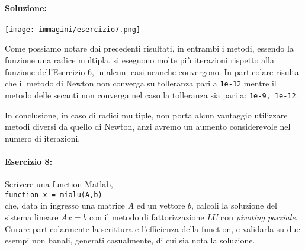 \documentclass[12pt]{article}
\begin{document}
\paragraph{Soluzione:}
\begin{center}
    \texttt{[image: immagini/esercizio7.png]}
\end{center}
Come possiamo notare dai precedenti risultati, in entrambi i metodi, essendo la funzione una radice multipla, si eseguono molte più iterazioni rispetto alla funzione 
dell'Esercizio 6, in alcuni casi neanche convergono.
In particolare risulta che il metodo di Newton non converga su tolleranza pari a \texttt{1e-12} mentre il metodo delle secanti non converga nel caso la tolleranza sia pari a:
\texttt{1e-9, 1e-12}.

In conclusione, in caso di radici multiple, non porta alcun vantaggio utilizzare metodi diversi da quello di Newton, anzi avremo un aumento considerevole nel numero di iterazioni.
\paragraph{Esercizio 8:}Scrivere una function Matlab,\\
\texttt{function x = mialu(A,b)}\\
che, data in ingresso una matrice \(A\) ed un vettore \(b\), calcoli la soluzione del sistema lineare \(Ax = b\) con il metodo di fattorizzazione \(LU\) 
con \textit{pivoting parziale}. Curare particolarmente la scrittura e l’efficienza della function, e validarla su due esempi non banali, generati casualmente, 
di cui sia nota la soluzione.
\end{document}
